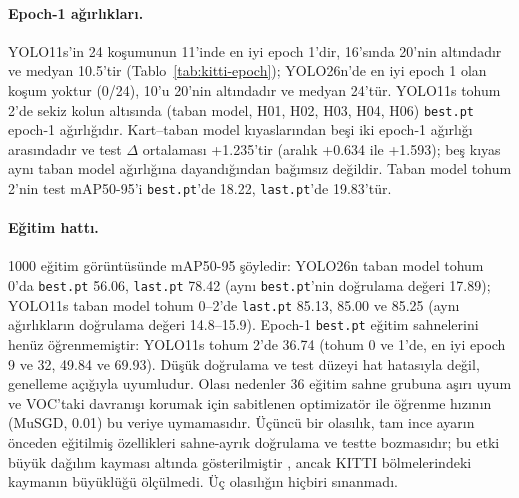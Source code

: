 \paragraph{Epoch-1 ağırlıkları.}
YOLO11s'in 24 koşumunun 11'inde en iyi epoch 1'dir, 16'sında 20'nin altındadır ve medyan 10.5'tir (Tablo~\ref{tab:kitti-epoch}); YOLO26n'de en iyi epoch 1 olan koşum yoktur (0/24), 10'u 20'nin altındadır ve medyan 24'tür. YOLO11s tohum 2'de sekiz kolun altısında (taban model, H01, H02, H03, H04, H06) \texttt{best.pt} epoch-1 ağırlığıdır. Kart--taban model kıyaslarından beşi iki epoch-1 ağırlığı arasındadır ve test $\Delta$ ortalaması +1.235'tir (aralık +0.634 ile +1.593); beş kıyas aynı taban model ağırlığına dayandığından bağımsız değildir. Taban model tohum 2'nin test mAP50-95'i \texttt{best.pt}'de 18.22, \texttt{last.pt}'de 19.83'tür.

\paragraph{Eğitim hattı.}
1000 eğitim görüntüsünde mAP50-95 şöyledir: YOLO26n taban model tohum 0'da \texttt{best.pt} 56.06, \texttt{last.pt} 78.42 (aynı \texttt{best.pt}'nin doğrulama değeri 17.89); YOLO11s taban model tohum 0--2'de \texttt{last.pt} 85.13, 85.00 ve 85.25 (aynı ağırlıkların doğrulama değeri 14.8--15.9). Epoch-1 \texttt{best.pt} eğitim sahnelerini henüz öğrenmemiştir: YOLO11s tohum 2'de 36.74 (tohum 0 ve 1'de, en iyi epoch 9 ve 32, 49.84 ve 69.93). Düşük doğrulama ve test düzeyi hat hatasıyla değil, genelleme açığıyla uyumludur. Olası nedenler 36 eğitim sahne grubuna aşırı uyum ve VOC'taki davranışı korumak için sabitlenen optimizatör ile öğrenme hızının (MuSGD, 0.01) bu veriye uymamasıdır. Üçüncü bir olasılık, tam ince ayarın önceden eğitilmiş özellikleri sahne-ayrık doğrulama ve testte bozmasıdır; bu etki büyük dağılım kayması altında gösterilmiştir \cite{kumar_2022_finetuning}, ancak KITTI bölmelerindeki kaymanın büyüklüğü ölçülmedi. Üç olasılığın hiçbiri sınanmadı.

